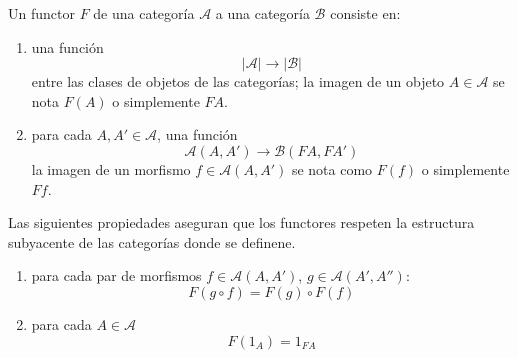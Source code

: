 \begin{definicion}
    Un functor $F$ de una categoría $\mathscr{A}$ a una categoría $\mathscr{B}$ consiste en:

    \begin{enumerate}
        \item una función \begin{equation}|\mathscr{A}| \longrightarrow |\mathscr{B}| \end{equation} entre las clases de objetos de las categorías; la imagen de un objeto $A \in \mathscr{A}$ se nota $F(A)$ o simplemente $FA$.

        \item para cada $A, A' \in \mathscr{A}$, una función \begin{equation}\mathscr{A}(A,A') \longrightarrow \mathscr{B}(FA,FA') \end{equation}
        la imagen de un morfismo $f \in \mathscr{A}(A,A')$ se nota como $F(f)$ o simplemente $Ff$.
    \end{enumerate}
    \label{functor}
\end{definicion}

\begin{observacion} Las siguientes propiedades aseguran que los functores respeten la estructura subyacente de las categorías donde se definene.
  \begin{enumerate}
        \item para cada par de morfismos $f \in \mathscr{A}(A,A')$, $g \in          \mathscr{A}(A',A''): $ \begin{equation} F(g \circ f) = F(g) \circ F(f)   \end{equation}

        \item para cada $A \in \mathscr{A}$ \begin{equation}
            F(1_{A}) = 1_{FA}
        \end{equation}
    \end{enumerate}  
\end{observacion}

